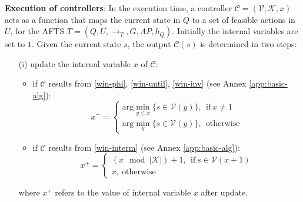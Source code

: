 
\begin{definition} \textbf{Execution of controllers}:
	In the execution time, a controller $ \mathcal{C}=(\mathcal{V},\mathcal{K},x) $ acts as a function that maps the current state in $ Q $ to a set of feasible actions in $ U $, for the AFTS $ T = (Q,U,\rightarrow_T, G,AP,h_Q)$. Initially the internal variables are set to $ 1 $. Given the current state $ s $, the output $ \mathcal{C}(s) $ is determined in two steps:
	\begin{itemize}
		\item[(i)] update the internal variable $ x $ of $ \mathcal{C} $: 
		\begin{itemize}
			\item 	if $ \mathcal{C} $ results from \eqref{win-phi}, \eqref{win-until}, \eqref{win-inv} {\color{purple}(see Annex \ref{app:basic-alg})}:
			\begin{displaymath}
			x^+ =	\begin{cases}
			\text{arg}\min_{y\leq x}\{s\in \mathcal{V}(y)\},\ \ \text{if}\ x\not=1\\
			\text{arg}\min_{y}\{s\in \mathcal{V}(y)\},\ \ \text{otherwise}
			\end{cases}
			\end{displaymath}
			\item  if $ \mathcal{C} $ results from \eqref{win-interm} {\color{purple}(see Annex \ref{app:basic-alg})}: %
			\begin{displaymath}
			x^+ = \begin{cases}
			(x\mod\vert\mathcal{K}\vert) + 1,\ \ \text{if}\ s\in \mathcal{V}(x+1)\\
			x,\ \text{otherwise}
			\end{cases}
			\end{displaymath}
		\end{itemize}
		where $ x^+ $ refers to the value of internal variable $ x $ after update.
		

\end{itemize}
\end{definition}
